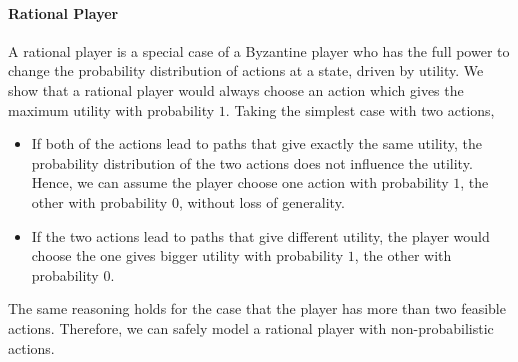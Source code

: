






\paragraph{Rational Player}
A rational player is a special case of a Byzantine player who has the full power to change the probability distribution of actions at a state, driven by utility. We show that a rational player would always choose an action which gives the maximum utility with probability $1$.
Taking the simplest case with two actions,
\begin{itemize}
\item If both of the actions lead to paths that give exactly the same utility, the probability distribution of the two actions does not influence the utility. Hence, we can assume the player choose one action with probability $1$, the other with probability $0$, without loss of generality.
\item If the two actions lead to paths that give different utility, the player would choose the one gives bigger utility with probability $1$, the other with probability $0$.
\end{itemize}
The same reasoning holds for the case that the player has more than two feasible actions.
Therefore, we can safely model a rational player with non-probabilistic actions.




